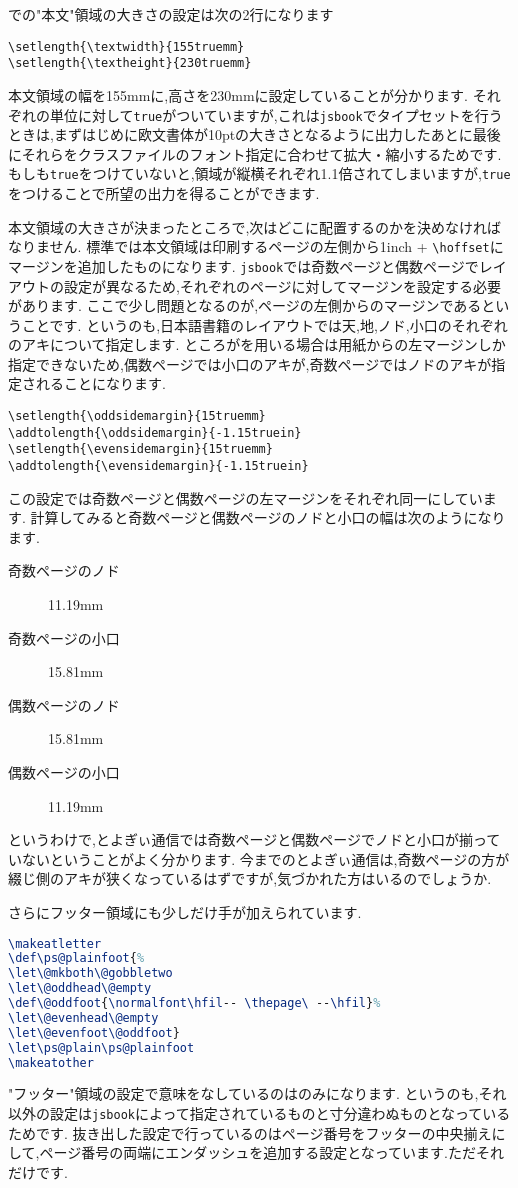 での"本文"領域の大きさの設定は次の2行になります
\begin{verbatim}
\setlength{\textwidth}{155truemm}
\setlength{\textheight}{230truemm}
\end{verbatim}
本文領域の幅を155mmに,高さを230mmに設定していることが分かります.
それぞれの単位に対して\texttt{true}がついていますが,これは\texttt{jsbook}でタイプセットを行うときは,まずはじめに欧文書体が10ptの大きさとなるように出力したあとに最後にそれらをクラスファイルのフォント指定に合わせて拡大・縮小するためです.
もしも\texttt{true}をつけていないと,領域が縦横それぞれ1.1倍されてしまいますが,\texttt{true}をつけることで所望の出力を得ることができます.

本文領域の大きさが決まったところで,次はどこに配置するのかを決めなければなりません.
標準では本文領域は印刷するページの左側から1inch + \verb|\|\texttt{hoffset}にマージンを追加したものになります.
\texttt{jsbook}では奇数ページと偶数ページでレイアウトの設定が異なるため,それぞれのページに対してマージンを設定する必要があります.
ここで少し問題となるのが,ページの左側からのマージンであるということです.
というのも,日本語書籍のレイアウトでは天,地,ノド,小口のそれぞれのアキについて指定します.
ところが{\pLaTeX}を用いる場合は用紙からの左マージンしか指定できないため,偶数ページでは小口のアキが,奇数ページではノドのアキが指定されることになります.
\begin{verbatim}
\setlength{\oddsidemargin}{15truemm}
\addtolength{\oddsidemargin}{-1.15truein}
\setlength{\evensidemargin}{15truemm}
\addtolength{\evensidemargin}{-1.15truein}
\end{verbatim}
この設定では奇数ページと偶数ページの左マージンをそれぞれ同一にしています.
計算してみると奇数ページと偶数ページのノドと小口の幅は次のようになります.
\begin{description}
	\item[奇数ページのノド] 11.19mm
	\item[奇数ページの小口] 15.81mm
	\item[偶数ページのノド] 15.81mm
	\item[偶数ページの小口] 11.19mm
\end{description}
というわけで,とよぎぃ通信では奇数ページと偶数ページでノドと小口が揃っていないということがよく分かります.
今までのとよぎぃ通信は,奇数ページの方が綴じ側のアキが狭くなっているはずですが,気づかれた方はいるのでしょうか.

さらにフッター領域にも少しだけ手が加えられています.
\begin{lstlisting}[caption = "フッター"領域の設定, label = list:footer, language=tex]
\makeatletter
\def\ps@plainfoot{%
\let\@mkboth\@gobbletwo
\let\@oddhead\@empty
\def\@oddfoot{\normalfont\hfil-- \thepage\ --\hfil}%
\let\@evenhead\@empty
\let\@evenfoot\@oddfoot}
\let\ps@plain\ps@plainfoot
\makeatother
\end{lstlisting}
"フッター"領域の設定で意味をなしているのは\texttt{\def\@oddfoot{\normalfont\hfil-- \thepage\ --\hfil}}のみになります.
というのも,それ以外の設定は\texttt{jsbook}によって指定されているものと寸分違わぬものとなっているためです.
抜き出した設定で行っているのはページ番号をフッターの中央揃えにして,ページ番号の両端にエンダッシュを追加する設定となっています.ただそれだけです.

